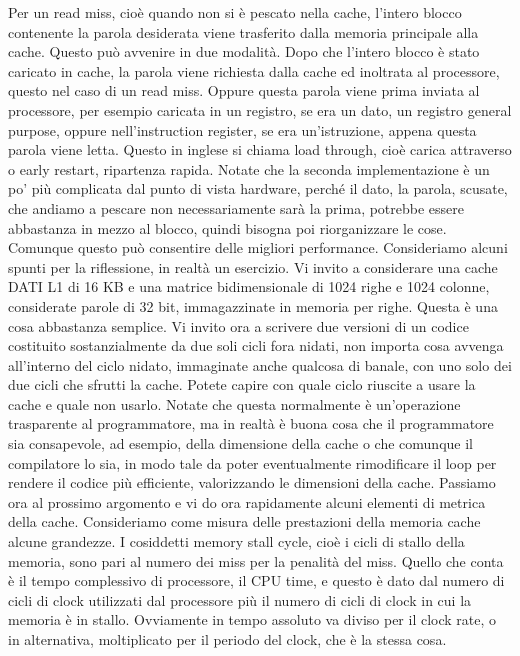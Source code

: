 Per un read miss, cioè quando non si è pescato nella cache, l'intero blocco contenente la parola desiderata viene trasferito dalla memoria principale alla cache.
Questo può avvenire in due modalità.
Dopo che l'intero blocco è stato caricato in cache, la parola viene richiesta dalla cache ed inoltrata al processore, questo nel caso di un read miss.
Oppure questa parola viene prima inviata al processore, per esempio caricata in un registro, se era un dato, un registro general purpose, oppure nell'instruction register, se era un'istruzione, appena questa parola viene letta.
Questo in inglese si chiama load through, cioè carica attraverso o early restart, ripartenza rapida.
Notate che la seconda implementazione è un po' più complicata dal punto di vista hardware, perché il dato, la parola, scusate, che andiamo a pescare non necessariamente sarà la prima, potrebbe essere abbastanza in mezzo al blocco, quindi bisogna poi riorganizzare le cose.
Comunque questo può consentire delle migliori performance.
Consideriamo alcuni spunti per la riflessione, in realtà un esercizio.
Vi invito a considerare una cache DATI L1 di 16 KB e una matrice bidimensionale di 1024 righe e 1024 colonne, considerate parole di 32 bit, immagazzinate in memoria per righe.
Questa è una cosa abbastanza semplice.
Vi invito ora a scrivere due versioni di un codice costituito sostanzialmente da due soli cicli fora nidati, non importa cosa avvenga all'interno del ciclo nidato, immaginate anche qualcosa di banale, con uno solo dei due cicli che sfrutti la cache.
Potete capire con quale ciclo riuscite a usare la cache e quale non usarlo.
Notate che questa normalmente è un'operazione trasparente al programmatore, ma in realtà è buona cosa che il programmatore sia consapevole, ad esempio, della dimensione della cache o che comunque il compilatore lo sia, in modo tale da poter eventualmente rimodificare il loop per rendere il codice più efficiente, valorizzando le dimensioni della cache.
Passiamo ora al prossimo argomento e vi do ora rapidamente alcuni elementi di metrica della cache.
Consideriamo come misura delle prestazioni della memoria cache alcune grandezze.
I cosiddetti memory stall cycle, cioè i cicli di stallo della memoria, sono pari al numero dei miss per la penalità del miss.
Quello che conta è il tempo complessivo di processore, il CPU time, e questo è dato dal numero di cicli di clock utilizzati dal processore più il numero di cicli di clock in cui la memoria è in stallo.
Ovviamente in tempo assoluto va diviso per il clock rate, o in alternativa, moltiplicato per il periodo del clock, che è la stessa cosa.
